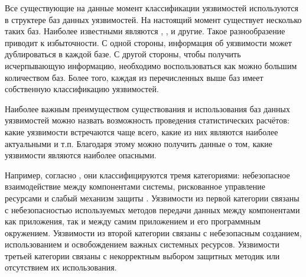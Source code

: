 \Sentence
Все существующие на данные момент классификации уязвимостей используются в структере баз данных 
уязвимостей.
\Sentence
На настоящий момент существует несколько таких баз. 
\Sentence
Наиболее известными являются  ,  
,   и другие. 
\Sentence
Такое разнообразение приводит к избыточности.
\Sentence
С одной стороны, информация об уязвимости может дублироваться в каждой базе.
\Sentence
С другой стороны, чтобы получить исчерпывающую информацию, необходимо воспользоваться как можно 
большим количеством баз.
\Sentence
Более того, каждая из перечисленных выше баз имеет собственную классификацию уязвимостей.

\Sentence
Наиболее важным преимуществом существования и использования баз данных уязвимостей можно назвать 
возможность проведения статистических расчётов: какие уязвимости встречаются чаще всего, какие из 
них являются наиболее актуальными и т.п.
\Sentence
Благодаря этому можно получить данные о том, какие уязвимости являются наиболее опасными. 

\Sentence
Например, согласно , они классифицируются тремя категориями: небезопасное 
взаимодействие между компонентами системы, рискованное управление ресурсами и слабый механизм 
защиты .
\Sentence
Уязвимости из первой категории связаны с небезопасностью используемых методов передачи данных между 
компонентами как приложения, так и между самим приложением и его программным окружением. 
\Sentence
Уязвимости из второй категории связаны с небезопасным созданием, использованием и освобождением 
важных системных ресурсов. 
\Sentence
Уязвимости третьей категории связаны с некорректным выбором защитных методик или отсутствием их 
использования.
